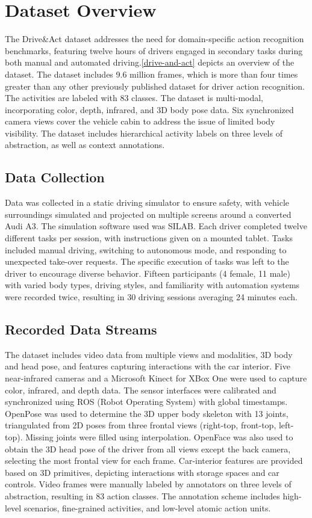 \documentclass{article}
\begin{document}
\section{Dataset Overview}

The Drive\&Act dataset \cite{drive_and_act_2019_iccv} addresses the need for domain-specific action recognition benchmarks, featuring twelve hours of drivers engaged in secondary tasks during both manual and automated driving.\ref{drive-and-act} depicts an overview of the dataset. The dataset includes 9.6 million frames, which is more than four times greater than any other previously published dataset for driver action recognition. The activities are labeled with 83 classes. The dataset is multi-modal, incorporating color, depth, infrared, and 3D body pose data. Six synchronized camera views cover the vehicle cabin to address the issue of limited body visibility. The dataset includes hierarchical activity labels on three levels of abstraction, as well as context annotations.
\subsection{Data Collection}
Data was collected in a static driving simulator to ensure safety, with vehicle surroundings simulated and projected on multiple screens around a converted Audi A3. The simulation software used was SILAB.
Each driver completed twelve different tasks per session, with instructions given on a mounted tablet. Tasks included manual driving, switching to autonomous mode, and responding to unexpected take-over requests. The specific execution of tasks was left to the driver to encourage diverse behavior.
Fifteen participants (4 female, 11 male) with varied body types, driving styles, and familiarity with automation systems were recorded twice, resulting in 30 driving sessions averaging 24 minutes each.
\subsection{Recorded Data Streams}
The dataset includes video data from multiple views and modalities, 3D body and head pose, and features capturing interactions with the car interior. Five near-infrared cameras and a Microsoft Kinect for XBox One were used to capture color, infrared, and depth data. The sensor interfaces were calibrated and synchronized using ROS (Robot Operating System) with global timestamps.
OpenPose was used to determine the 3D upper body skeleton with 13 joints, triangulated from 2D poses from three frontal views (right-top, front-top, left-top). Missing joints were filled using interpolation. OpenFace was also used to obtain the 3D head pose of the driver from all views except the back camera, selecting the most frontal view for each frame. Car-interior features are provided based on 3D primitives, depicting interactions with storage spaces and car controls. Video frames were manually labeled by annotators on three levels of abstraction, resulting in 83 action classes. The annotation scheme includes high-level scenarios, fine-grained activities, and low-level atomic action units.
\end{document}
